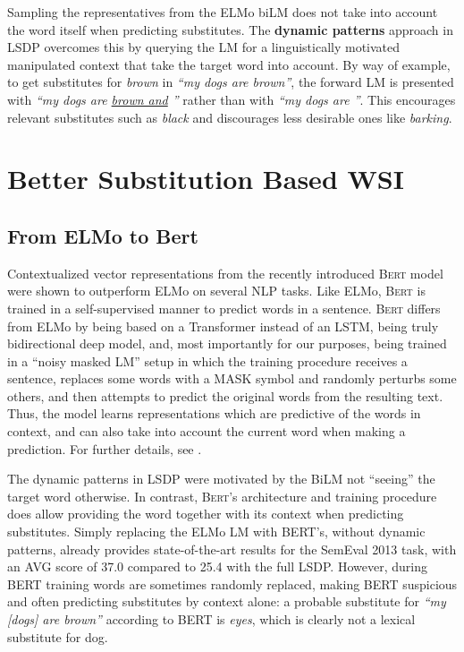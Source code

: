\documentclass[11pt,a4paper]{article}
\begin{document}
Sampling the representatives from the ELMo biLM does not take into account the
word itself when predicting substitutes. The \textbf{dynamic patterns} approach
in LSDP overcomes this by querying the LM for a linguistically motivated
manipulated context that
take the target word into account. 
By way of example, to get substitutes for \emph{brown} in \emph{``my dogs are
brown''}, the forward LM is presented with \emph{``my dogs are \underline{brown and} ''} rather than with \emph{``my dogs are ''}. This encourages relevant substitutes
such as \emph{black} and discourages less desirable ones like \emph{barking}.



\section{Better Substitution Based WSI}

\subsection{From ELMo to Bert}
Contextualized vector representations from the recently introduced \textsc{Bert} model \cite{devlin2018bert} were shown to outperform ELMo on several NLP tasks. Like ELMo, \textsc{Bert} is trained in a self-supervised manner to predict words in a sentence. \textsc{Bert} differs from ELMo by being based on a Transformer \cite{vaswani2017attention} instead of an LSTM, being truly bidirectional deep model, and, most importantly for our purposes, being trained in a ``noisy masked LM'' setup in which the training procedure receives a sentence, replaces some words with a MASK symbol and randomly perturbs some others, and then attempts to predict the original words from the resulting text. Thus, the model learns representations which are predictive of the words in context, and can also take into account the current word when making a prediction. For further details, see \cite{devlin2018bert}.

The dynamic patterns in LSDP were motivated by the BiLM not ``seeing'' the
target word otherwise. In contrast, \textsc{Bert}'s architecture and training procedure
does allow providing the word together with its context when predicting
substitutes. Simply replacing the ELMo LM with BERT's, without dynamic patterns, already provides state-of-the-art
results for the SemEval 2013 task, with an AVG score of 37.0 compared to 25.4 with
the full LSDP.
However, during BERT training words are sometimes randomly replaced, making
BERT suspicious and often predicting substitutes by context alone: a probable
substitute for \emph{``my [dogs] are brown''} according to BERT is \emph{eyes}, which is clearly not a lexical substitute for dog.
\end{document}

